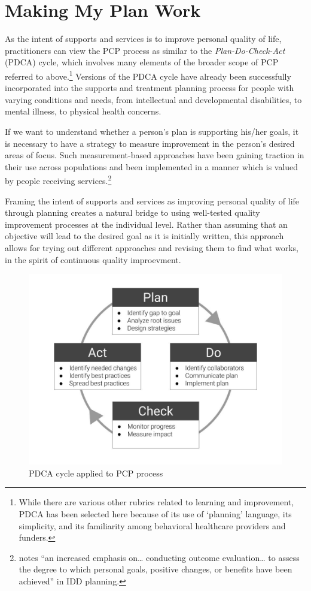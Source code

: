 \documentclass[
]{book}
\begin{document}
\hypertarget{pdca_intro}{%
\section{Making My Plan Work}\label{pdca_intro}}

As the intent of supports and services is to improve personal quality of life, practitioners can view the PCP process as similar to the \emph{Plan-Do-Check-Act} (PDCA) cycle, which involves many elements of the broader scope of PCP referred to above.\footnote{While there are various other rubrics related to learning and improvement, PDCA has been selected here because of its use of `planning' language, its simplicity, and its familiarity among behavioral healthcare providers and funders.} Versions of the PDCA cycle have already been successfully incorporated into the supports and treatment planning process for people with varying conditions and needs, from intellectual and developmental disabilities, to mental illness, to physical health concerns.

If we want to understand whether a person's plan is supporting his/her goals, it is necessary to have a strategy to measure improvement in the person's desired areas of focus. Such measurement-based approaches have been gaining traction in their use across populations and been implemented in a manner which is valued by people receiving services.\footnote{\citet{shalock-changes} notes ``an increased emphasis on\ldots{} conducting outcome evaluation\ldots{} to assess the degree to which personal goals, positive changes, or benefits have been achieved'' in IDD planning.}

Framing the intent of supports and services as improving personal quality of life through planning creates a natural bridge to using well-tested quality improvement processes at the individual level. Rather than assuming that an objective will lead to the desired goal as it is initially written, this approach allows for trying out different approaches and revising them to find what works, in the spirit of continuous quality improevment.

\begin{figure}
\includegraphics[width=24in]{_bookdown_files/img/pdca} \caption{PDCA cycle applied to PCP process}\label{fig:unnamed-chunk-5}
\end{figure}
\end{document}
